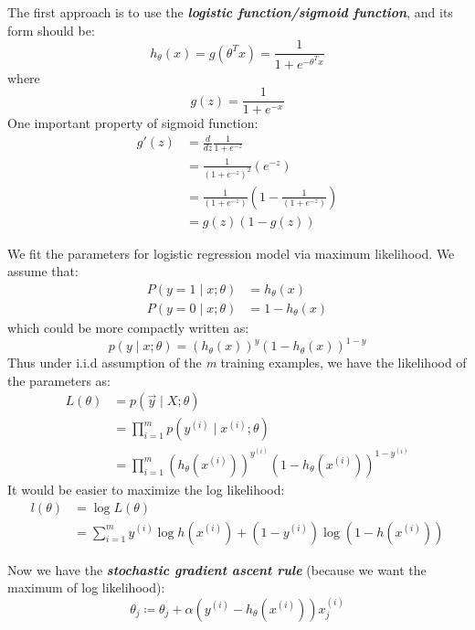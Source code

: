 \documentclass{article}
\begin{document}
The first approach is to use the \emph{\textbf{logistic function/sigmoid function}}, and its form should be:
\begin{equation*}
h_\theta(x)=g(\theta^Tx)=\frac{1}{1+e^{-\theta^Tx}}
\end{equation*}
where
\begin{equation*}
g(z)=\frac{1}{1+e^{-x}}
\end{equation*}
One important property of sigmoid function:
\begin{align*}
g'(z) &= \frac{d}{dz}\frac{1}{1+e^{-z}} \\
      &= \frac{1}{{(1+e^{-z})}^2}(e^{-z}) \\
      &= \frac{1}{(1+e^{-z})}\left(1-\frac{1}{(1+e^{-z})}\right) \\
      &= g(z)(1-g(z))
\end{align*}

We fit the parameters for logistic regression model via maximum likelihood.
We assume that:
\begin{align*}
P(y=1\mid x;\theta) &= h_\theta(x) \\
P(y=0\mid x;\theta) &= 1 - h_\theta(x)
\end{align*}
which could be more compactly written as:
\begin{equation*}
p(y\mid x;\theta) = (h_\theta(x))^y(1-h_\theta(x))^{1-y}
\end{equation*}
Thus under i.i.d assumption of the \emph{m} training examples, we have the likelihood of the parameters as:
\begin{align*}
L(\theta) &= p(\vec{y}\mid X;\theta) \\
          &= \prod\limits_{i=1}^mp(y^{(i)}\mid x^{(i)};\theta) \\
          &= \prod\limits_{i=1}^m\left(h_\theta(x^{(i)})\right)^{y^{(i)}}\left(1-h_\theta(x^{(i)})\right)^{1-y^{(i)}}
\end{align*}
It would be easier to maximize the log likelihood:
\begin{align*}
l(\theta) &= \log L(\theta) \\
          &= \sum\limits_{i=1}^my^{(i)}\log h(x^{(i)}) + (1-y^{(i)}) \log(1-h(x^{(i)}))
\end{align*}

Now we have the \emph{\textbf{stochastic gradient ascent rule}} (because we want the maximum of log likelihood):
\begin{equation*}
\theta_j\coloneqq\theta_j + \alpha(y^{(i)}-h_\theta(x^{(i)}))x_j^{(i)}
\end{equation*}
\end{document}
